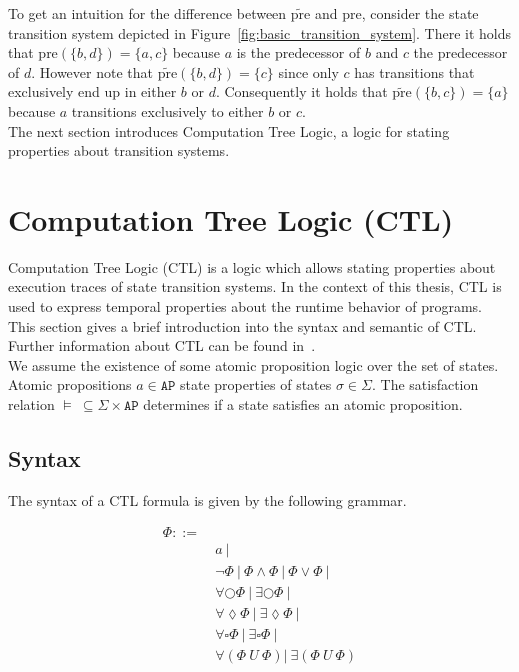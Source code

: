 \documentclass[11pt,a4paper,titlepage]{article}
\theoremstyle{definition}
\begin{document}
To get an intuition for the difference between $\widetilde{\text{pre}}$ and $\text{pre}$, consider the state transition system 
depicted in Figure~\ref{fig:basic_transition_system}. There it holds that $\text{pre}(\{b, d\}) = \{a, c\}$ 
because $a$ is the predecessor of $b$ and $c$ the predecessor of $d$. 
However note that $\widetilde{\text{pre}}(\{b, d\}) = \{c\}$ since only $c$ has 
transitions that exclusively end up in either $b$ or $d$. 
Consequently it holds that $\widetilde{\text{pre}}(\{b, c\}) = \{a\}$ because $a$ transitions exclusively to either $b$ or $c$.\\

The next section introduces Computation Tree Logic, 
a logic for stating properties about transition systems.  

\section{Computation Tree Logic (CTL)}\label{sec:computation_tree_logic}

Computation Tree Logic (CTL) is a logic which allows stating properties about execution traces of state transition systems. 
In the context of this thesis, CTL is used to express temporal properties about the runtime behavior of programs. 
This section gives a brief introduction into the syntax and semantic of CTL.  
Further information about CTL can be found in~\cite{baier2008principles}.\\

We assume the existence of some atomic proposition logic over the set of states. 
Atomic propositions $a \in \mathtt{AP}$ state properties of states $\sigma \in \Sigma$. 
The satisfaction relation $\models \ \subseteq \Sigma \times \mathtt{AP}$ determines 
if a state satisfies an atomic proposition.


\subsection{Syntax}
The syntax of a CTL formula is given by the following grammar.

\begin{align*}
    \Phi  ::= \ & \\ 
    & a \ | \\
    & \neg \Phi \ | \ \Phi \land \Phi \ | \ \Phi \lor \Phi \ | \\
    & \forall\bigcirc\Phi \ | \ \exists\bigcirc\Phi \ | \\
    & \forall\lozenge\Phi \ | \ \exists\lozenge\Phi \ | \\
    & \forall\square\Phi \ | \ \exists\square\Phi \ | \\
    & \forall(\Phi \ U \ \Phi) | \ \exists(\Phi \ U \ \Phi) 
\end{align*}
\end{document}
